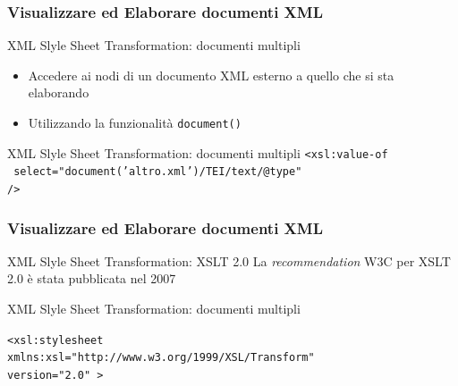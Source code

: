 \begin{frame}
    \frametitle{Visualizzare ed Elaborare documenti XML}
    \addtocounter{nframe}{1}
    

     \begin{block}{XML Slyle Sheet Transformation: documenti multipli}
        \begin{itemize}
            \item Accedere ai nodi di un documento XML esterno a quello che si sta elaborando
            \item Utilizzando la funzionalità \texttt{document()}
        \end{itemize}

     \end{block}

     \begin{block}{XML Slyle Sheet Transformation: documenti multipli}
        \texttt{<xsl:value-of}
        \\\texttt{ select="document(’altro.xml’)/TEI/text/@type"}
        \\\texttt{/>}

     \end{block}

\end{frame}

\begin{frame}
    \frametitle{Visualizzare ed Elaborare documenti XML}
    \addtocounter{nframe}{1}
    

     \begin{block}{XML Slyle Sheet Transformation: XSLT 2.0}
        La \textit{recommendation} W3C per XSLT 2.0 è stata pubblicata nel 2007
     \end{block}

     \begin{block}{XML Slyle Sheet Transformation: documenti multipli}
       
        \texttt{<xsl:stylesheet} 
            \\\texttt{xmlns:xsl="http://www.w3.org/1999/XSL/Transform"} 
            \\\texttt{version="2.0" >}


     \end{block}

\end{frame}


